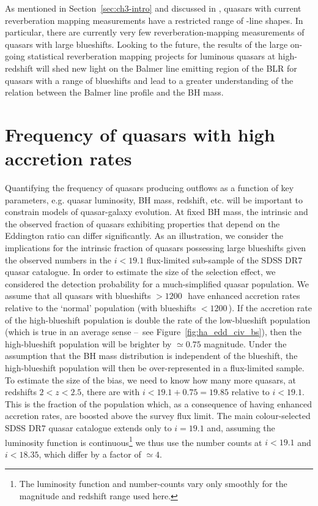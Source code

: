 As mentioned in Section~\ref{sec:ch3-intro} and discussed in \citet{richards11}, quasars with current reverberation mapping measurements have a restricted range of -line shapes.
In particular, there are currently very few reverberation-mapping measurements of quasars with large  blueshifts.
Looking to the future, the results of the large on-going statistical reverberation mapping projects \citep[e.g.][]{shen15,kingoz15} for luminous quasars at high-redshift will shed new light on the Balmer line emitting region of the BLR for quasars with a range of  blueshifts and lead to a greater understanding of the relation between the Balmer line profile and the BH mass.


\section{Frequency of quasars with high accretion rates}

Quantifying the frequency of quasars producing outflows as a function of key parameters, e.g. quasar luminosity, BH mass, redshift, etc. will be important to constrain models of quasar-galaxy evolution.
At fixed BH mass, the intrinsic and the observed fraction of quasars exhibiting properties that depend on the Eddington ratio can differ significantly.
As an illustration, we consider the implications for the intrinsic fraction of quasars possessing large  blueshifts given the observed numbers in the $i<19.1$ flux-limited sub-sample of the SDSS DR$7$ quasar catalogue.
In order to estimate the size of the selection effect, we considered the detection probability for a much-simplified quasar population.
We assume that all quasars with  blueshifts $>1200$\,\kms\, have enhanced accretion rates relative to the `normal' population (with  blueshifts $<1200$\,\kms).
If the accretion rate of the high-blueshift population is double the rate of the low-blueshift population (which is true in an average sense \---\ see Figure~\ref{fig:ha_edd_civ_bs}), then the high-blueshift population will be brighter by $\simeq0.75$ magnitude.
Under the assumption that the BH mass distribution is independent of the  blueshift, the high-blueshift population will then be over-represented in a flux-limited sample.
To estimate the size of the bias, we need to know how many more quasars, at redshifts $2 < z < 2.5$, there are with $i<19.1+0.75=19.85$ relative to $i < 19.1$.
This is the fraction of the population which, as a consequence of having enhanced accretion rates, are boosted above the survey flux limit.
The main colour-selected SDSS DR$7$ quasar catalogue extends only to $i= 19.1$ and, assuming the luminosity function is continuous\footnote{The luminosity function and number-counts vary only smoothly \citep[e.g.][]{ross13} for the magnitude and redshift range used here.} we thus use the number counts at $i < 19.1$ and $i < 18.35$, which differ by a factor of $\simeq 4$.

